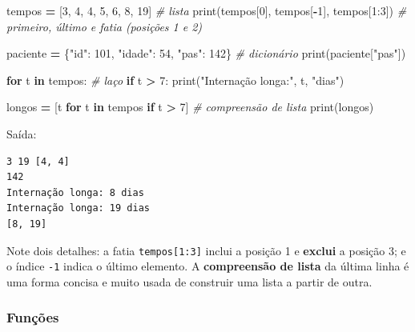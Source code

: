 \documentclass[
]{book}
\newenvironment{Shaded}{\begin{snugshade}}{\end{snugshade}}
\newcommand{\BuiltInTok}[1]{#1}
\newcommand{\CommentTok}[1]{\textcolor[rgb]{0.56,0.35,0.01}{\textit{#1}}}
\newcommand{\ControlFlowTok}[1]{\textcolor[rgb]{0.13,0.29,0.53}{\textbf{#1}}}
\newcommand{\DecValTok}[1]{\textcolor[rgb]{0.00,0.00,0.81}{#1}}
\newcommand{\KeywordTok}[1]{\textcolor[rgb]{0.13,0.29,0.53}{\textbf{#1}}}
\newcommand{\NormalTok}[1]{#1}
\newcommand{\OperatorTok}[1]{\textcolor[rgb]{0.81,0.36,0.00}{\textbf{#1}}}
\newcommand{\StringTok}[1]{\textcolor[rgb]{0.31,0.60,0.02}{#1}}
\begin{document}
\begin{Shaded}
\begin{Highlighting}[]
\NormalTok{tempos }\OperatorTok{=}\NormalTok{ [}\DecValTok{3}\NormalTok{, }\DecValTok{4}\NormalTok{, }\DecValTok{4}\NormalTok{, }\DecValTok{5}\NormalTok{, }\DecValTok{6}\NormalTok{, }\DecValTok{8}\NormalTok{, }\DecValTok{19}\NormalTok{]          }\CommentTok{\# lista}
\BuiltInTok{print}\NormalTok{(tempos[}\DecValTok{0}\NormalTok{], tempos[}\OperatorTok{{-}}\DecValTok{1}\NormalTok{], tempos[}\DecValTok{1}\NormalTok{:}\DecValTok{3}\NormalTok{])  }\CommentTok{\# primeiro, último e fatia (posições 1 e 2)}

\NormalTok{paciente }\OperatorTok{=}\NormalTok{ \{}\StringTok{"id"}\NormalTok{: }\DecValTok{101}\NormalTok{, }\StringTok{"idade"}\NormalTok{: }\DecValTok{54}\NormalTok{, }\StringTok{"pas"}\NormalTok{: }\DecValTok{142}\NormalTok{\}   }\CommentTok{\# dicionário}
\BuiltInTok{print}\NormalTok{(paciente[}\StringTok{"pas"}\NormalTok{])}

\ControlFlowTok{for}\NormalTok{ t }\KeywordTok{in}\NormalTok{ tempos:                          }\CommentTok{\# laço}
    \ControlFlowTok{if}\NormalTok{ t }\OperatorTok{\textgreater{}} \DecValTok{7}\NormalTok{:}
        \BuiltInTok{print}\NormalTok{(}\StringTok{"Internação longa:"}\NormalTok{, t, }\StringTok{"dias"}\NormalTok{)}

\NormalTok{longos }\OperatorTok{=}\NormalTok{ [t }\ControlFlowTok{for}\NormalTok{ t }\KeywordTok{in}\NormalTok{ tempos }\ControlFlowTok{if}\NormalTok{ t }\OperatorTok{\textgreater{}} \DecValTok{7}\NormalTok{]     }\CommentTok{\# compreensão de lista}
\BuiltInTok{print}\NormalTok{(longos)}
\end{Highlighting}
\end{Shaded}

Saída:

\begin{verbatim}
3 19 [4, 4]
142
Internação longa: 8 dias
Internação longa: 19 dias
[8, 19]
\end{verbatim}

Note dois detalhes: a fatia \texttt{tempos{[}1:3{]}} inclui a posição 1 e \textbf{exclui} a posição 3; e o índice \texttt{-1} indica o último elemento. A \textbf{compreensão de lista} da última linha é uma forma concisa e muito usada de construir uma lista a partir de outra.

\subsubsection{Funções}\label{funuxe7uxf5es}
\end{document}
